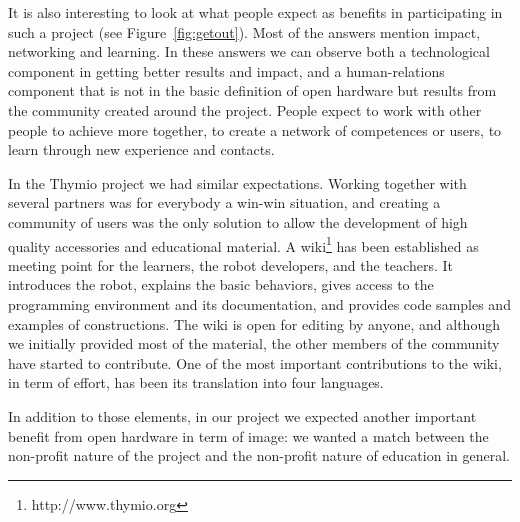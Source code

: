 \documentclass[letterpaper, 10 pt, conference]{ieeeconf}  %
\begin{document}
It is also interesting to look at what people expect as benefits in participating in such a project (see Figure~\ref{fig:getout}).
Most of the answers mention impact, networking and learning. 
In these answers we can observe both a technological component in getting better results and impact, and a human-relations component that is not in the basic definition of open hardware but results from the community created around the project. 
People expect to work with other people to achieve more together, to create a network of competences or users, to learn through new experience and contacts. 

In the Thymio project we had similar expectations. 
Working together with several partners was for everybody a win-win situation, and creating a community of users was the only solution to allow the development of high quality accessories and educational material.
A wiki\footnote{http://www.thymio.org} has been established as meeting point for the learners, the robot developers, and the teachers.
It introduces the robot, explains the basic behaviors, gives access to the programming environment and its documentation, and provides code samples and examples of constructions.
The wiki is open for editing by anyone, and although we initially provided most of the material, the other members of the community have started to contribute.
One of the most important contributions to the wiki, in term of effort, has been its translation into four languages.

In addition to those elements, in our project we expected another important benefit from open hardware in term of image: we wanted a match between the non-profit nature of the project and the non-profit nature of education in general. 
\end{document}
